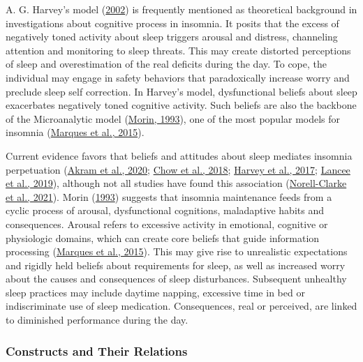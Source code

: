 \documentclass[
  ,doc,11pt, twoside,floatsintext]{apa6}
\begin{document}
A. G. Harvey's model (\protect\hyperlink{ref-harvey2002}{2002}) is frequently mentioned as theoretical background in investigations about cognitive process in insomnia. It posits that the excess of negatively toned activity about sleep triggers arousal and distress, channeling attention and monitoring to sleep threats. This may create distorted perceptions of sleep and overestimation of the real deficits during the day. To cope, the individual may engage in safety behaviors that paradoxically increase worry and preclude sleep self correction. In Harvey's model, dysfunctional beliefs about sleep exacerbates negatively toned cognitive activity. Such beliefs are also the backbone of the Microanalytic model (\protect\hyperlink{ref-morin1993insomnia}{Morin, 1993}), one of the most popular models for insomnia (\protect\hyperlink{ref-marques2015}{Marques et al., 2015}).

Current evidence favors that beliefs and attitudes about sleep mediates insomnia perpetuation (\protect\hyperlink{ref-akram2020}{Akram et al., 2020}; \protect\hyperlink{ref-chow2018}{Chow et al., 2018}; \protect\hyperlink{ref-harvey2017}{Harvey et al., 2017}; \protect\hyperlink{ref-lancee2019}{Lancee et al., 2019}), although not all studies have found this association (\protect\hyperlink{ref-norell-clarke2021}{Norell-Clarke et al., 2021}). Morin (\protect\hyperlink{ref-morin1993}{1993}) suggests that insomnia maintenance feeds from a cyclic process of arousal, dysfunctional cognitions, maladaptive habits and consequences. Arousal refers to excessive activity in emotional, cognitive or physiologic domains, which can create core beliefs that guide information processing (\protect\hyperlink{ref-marques2015}{Marques et al., 2015}). This may give rise to unrealistic expectations and rigidly held beliefs about requirements for sleep, as well as increased worry about the causes and consequences of sleep disturbances. Subsequent unhealthy sleep practices may include daytime napping, excessive time in bed or indiscriminate use of sleep medication. Consequences, real or perceived, are linked to diminished performance during the day.

\hypertarget{constructs-and-their-relations}{%
\subsubsection{Constructs and Their Relations}\label{constructs-and-their-relations}}
\end{document}
